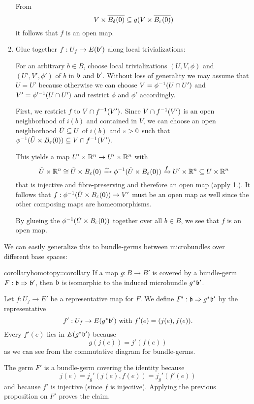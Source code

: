 \begin{myproof}
\begin{enumerate}
        From
        \[ V \cross \clball[\delta][x_1] \sub g(V \cross \clball[\eps][x_0]) \]
        it follows that $f$ is an open map.

        \item Glue together $f: U_f \to E(\bb')$ along local trivializations:

        For an arbitrary $b \in B$, choose local trivializations $(U, V, \phi)$ and $(U', V', \phi')$ of $b$ in $\bb$ and $\bb'$.
        Without loss of generality we may assume that $U = U'$ because otherwise we can choose $V = \phi^{-1}(U \cap U')$ and $V' = \phi'^{-1}(U \cap U')$
        and restrict $\phi$ and $\phi'$ accordingly.   
        
        First, we restrict $f$ to $V \cap f^{-1}(V')$. Since $V \cap f^{-1}(V')$ is an open neighborhood of $i(b)$ and contained in $V$, we can choose
        an open neighborhood $\tilde{U} \subseteq{} U$ of $i(b)$ and $\varepsilon{} > 0$ such that $\inv{\phi}(\tilde{U} \cross \ball[\eps]) \sub V \cap \inv{f}(V')$.
        
        This yields a map $U' \times \mathbb{R}^n \to U' \times \mathbb{R}^n$ with
        \[ \tilde{U} \cross \R^n \cong  \tilde{U} \cross \ball[\eps] \isomto \inv{\phi}(\tilde{U} \cross \ball[\eps]) \xto{f} U' \cross \R^n \sub U \cross \R^n \]
        that is injective and fibre-preserving and therefore an open map (apply 1.).
        It follows that $f: \inv{\phi}(\tilde{U} \cross \ball[\eps]) \to V'$ must be an open map as well since the other composing maps are homeomorphisms.

        By glueing the $\inv{\phi}(\tilde{U} \cross \ball[\eps])$ together over all $b \in B$, we see that $f$ is an open map.
    \end{enumerate}
\end{myproof}

\begin{myparagraph}
    We can easily generalize this to bundle-germs between microbundles over different base spaces:
\end{myparagraph}

\begin{mystatement}{corollary}{homotopy::corollary}
    If a map $g: B \to B'$ is covered by a bundle-germ $\germdef{F}{\bb}{\bb'}$, then $\bb$ is isomorphic to the induced microbundle $\ind{g}\bb'$.
\end{mystatement}

\begin{myproof}
    Let $f: U_f \to E'$ be a representative map for $F$.
    We define $\germdef{F'}{\bb}{\ind{g}\bb'}$ by the representative
    \[ f': U_f \to E(\ind{g}\bb') \twith f'(e) = (j(e), f(e)). \]
    Every $f'(e)$ lies in $E(\ind{g}\bb')$ because
    \[ g(j(e)) = j'(f(e)) \]
    as we can see from the commutative diagram for bundle-germs.

    The germ $F'$ is a bundle-germ covering the identity because
    \[ j(e) = j_g'(j(e), f(e)) = j_g'(f'(e)) \]
    and because $f'$ is injective (since $f$ is injective).
    Applying the previous proposition on $F'$ proves the claim.
\end{myproof}